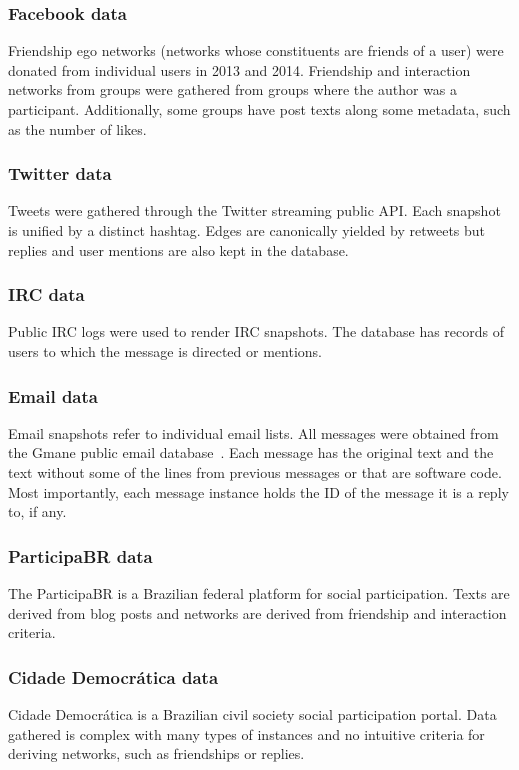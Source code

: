 \subsubsection{Facebook data}
Friendship ego networks (networks whose constituents are friends of a user)
were donated from individual users in 2013 and 2014.
Friendship and interaction networks from groups were gathered from
groups where the author was a participant.
Additionally, some groups have post texts along some metadata, such as
the number of likes.

\subsubsection{Twitter data}
Tweets were gathered through the Twitter streaming public API.
Each snapshot is unified by a distinct hashtag.
Edges are canonically yielded by retweets but replies and user mentions
are also kept in the database.

\subsubsection{IRC data}
Public IRC logs were used to render IRC snapshots.
The database has records of users to which the message is directed or
mentions.

\subsubsection{Email data}
Email snapshots refer to individual email lists.
All messages were obtained from the Gmane public email database~\cite{gmane}.
Each message has the original text and the text without some of the lines
from previous messages or that are software code.
Most importantly, each message instance holds the ID of the message it is
a reply to, if any.

\subsubsection{ParticipaBR data}
The ParticipaBR is a Brazilian federal platform for social participation.
Texts are derived from blog posts and networks are derived from
friendship and interaction criteria.

\subsubsection{Cidade Democr\'atica data}
Cidade Democr\'atica is a Brazilian civil society social participation portal.
Data gathered is complex with many types of instances and no intuitive criteria
for deriving networks, such as friendships or replies.

